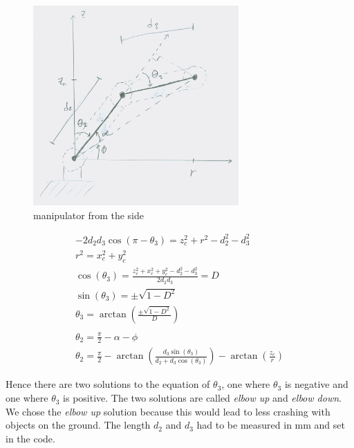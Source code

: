 \begin{figure}[H]
    \centering
    \includegraphics[width=0.7\textwidth]{graphics/Inverse_kinematic_1.jpg}	
    \caption{manipulator from the side}
    \label{fig:manipulator_side} 
\end{figure}

\begin{displaymath}
\begin{split}
-2d_{2}d_{3}\cos(\pi - \theta_{3}) = z_{c}^2 + r^2 - d_{2}^2 - d_{3}^2\\
r^2 = x_{c}^2 + y_{c}^2\\
\cos(\theta_{3}) = \frac{z_{c}^2 + x_{c}^2 + y_{c}^2 - d_{2}^2 - d_{3}^2}{2d_{2}d_{3}} = D\\
\sin(\theta_{3}) = \pm\sqrt{1-D^2}\\
\theta_{3} = \arctan(\frac{\pm\sqrt{1-D^2}}{D})
\\
\\
\theta_{2} = \frac{\pi}{2} - \alpha - \phi\\
\theta_{2} = \frac{\pi}{2} - \arctan(\frac{d_{3}\sin(\theta_{3})}{d_{2}+d_{3}\cos(\theta_{3})}) - \arctan(\frac{z_{c}}{r})
\end{split}
\end{displaymath}

Hence there are two solutions to the equation of $\theta_{3}$, one where $\theta_{3}$ is negative and one where $\theta_{3}$ is positive. The two solutions are called \textit{elbow up} and \textit{elbow down}. We chose the \textit{elbow up} solution because this would lead to less crashing with objects on the ground.
The length $d_{2}$ and $d_{3}$ had to be measured in mm and set in the code.

